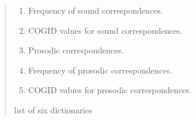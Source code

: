 \documentclass[letterpaper,10pt,english]{sphinxmanual}
\begin{document}
\begin{fulllineitems}
\begin{quote}
\begin{description}
\begin{enumerate}
\item {} 
\sphinxAtStartPar
Frequency of sound correspondences.

\item {} 
\sphinxAtStartPar
COGID values for sound correspondences.

\item {} 
\sphinxAtStartPar
Prosodic correspondences.

\item {} 
\sphinxAtStartPar
Frequency of prosodic correspondences.

\item {} 
\sphinxAtStartPar
COGID values for prosodic correspondences.

\end{enumerate}


\sphinxAtStartPar
list of six dictionaries

\end{description}\end{quote}

\sphinxAtStartPar
{}


\end{fulllineitems}
\end{document}
